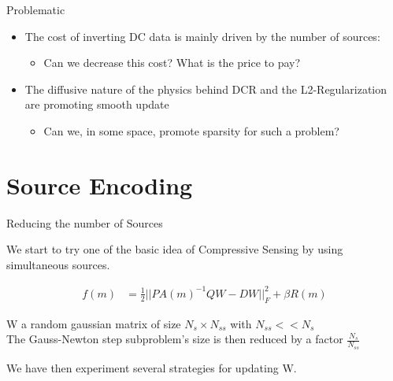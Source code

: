 \documentclass[12pt]{beamer}
\begin{document}
\begin{frame}{Problematic}

\begin{itemize}
  \item The cost of inverting DC data is mainly driven by the number of sources:
  \begin{itemize}
    \item Can we decrease this cost? What is the price to pay?
  \end{itemize}
\vspace{20pt}
  \item The diffusive nature of the physics behind DCR and the L2-Regularization are promoting smooth update
  \begin{itemize}
    \item Can we, in some space, promote sparsity for such a problem?
  \end{itemize}
\end{itemize}

\end{frame}

\section{Source Encoding}

\begin{frame}{Reducing the number of Sources}

We start to try one of the basic idea of Compressive Sensing by using simultaneous sources.

\begin{align}
f(m) & = \frac{1}{2} ||PA(m)^{-1}QW-DW||_F^2  +\beta R(m)
\end{align}

W a random gaussian matrix of size $N_s \times N_{ss}$ with $N_{ss}<<N_s$ \\
The Gauss-Newton step subproblem's size is then reduced by a factor $\frac{N_{s}}{N_{ss}}$

We have then experiment several strategies for updating W.

\end{frame}
\end{document}
